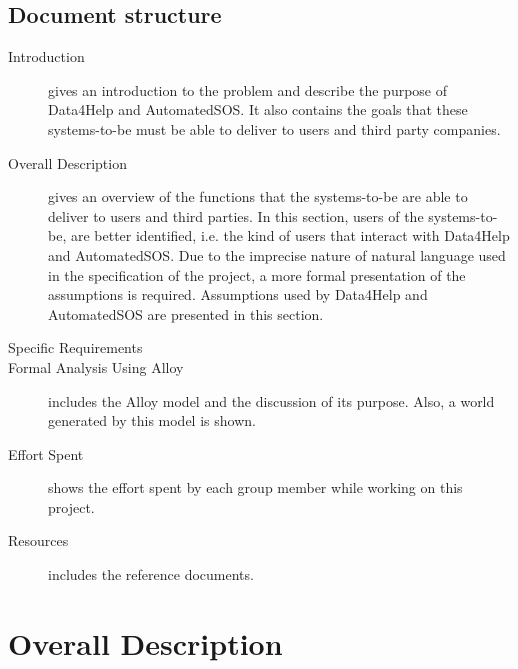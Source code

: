 \documentclass{article}
\begin{document}
\subsection{Document structure}
\begin{description}
	\item [Introduction] gives an introduction to the problem and describe the purpose of Data4Help and AutomatedSOS. It also contains the goals that these systems-to-be must be able to deliver to users and third party companies.
	\item [Overall Description] gives an overview of the functions that the systems-to-be are able to deliver to users and third parties. In this section, users of the systems-to-be, are better identified, i.e. the kind of users that interact with Data4Help and AutomatedSOS. Due to the imprecise nature of natural language used in the specification of the project, a more formal presentation of the assumptions is required. Assumptions used by Data4Help and AutomatedSOS are presented in this section. 
	\item [Specific Requirements]
	\item [Formal Analysis Using Alloy] includes the Alloy model and the discussion of its purpose. Also, a world generated by this model is shown.
	\item [Effort Spent] shows the effort spent by each group member while working on this project.
	\item [Resources] includes the reference documents. 
\end{description}
\section{Overall Description}
\end{document}
